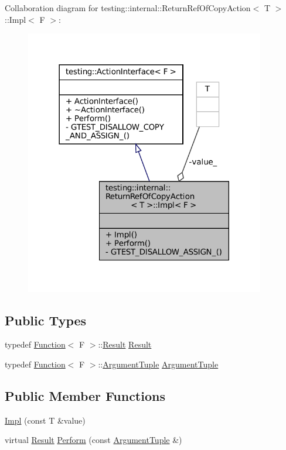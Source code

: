 Collaboration diagram for testing\+:\+:internal\+:\+:Return\+Ref\+Of\+Copy\+Action$<$ T $>$\+:\+:Impl$<$ F $>$\+:
\nopagebreak
\begin{figure}[H]
\begin{center}
\leavevmode
\includegraphics[width=297pt]{classtesting_1_1internal_1_1ReturnRefOfCopyAction_1_1Impl__coll__graph}
\end{center}
\end{figure}
\subsection*{Public Types}
\begin{DoxyCompactItemize}
\item 
typedef \hyperlink{structtesting_1_1internal_1_1Function}{Function}$<$ F $>$\+::\hyperlink{classtesting_1_1ActionInterface_a7477de2fe3e4e01c59db698203acaee7}{Result} \hyperlink{classtesting_1_1internal_1_1ReturnRefOfCopyAction_1_1Impl_abb413010cf24f603295ac6426adbe9d0}{Result}
\item 
typedef \hyperlink{structtesting_1_1internal_1_1Function}{Function}$<$ F $>$\+::\hyperlink{classtesting_1_1ActionInterface_af72720d864da4d606629e83edc003511}{Argument\+Tuple} \hyperlink{classtesting_1_1internal_1_1ReturnRefOfCopyAction_1_1Impl_aae70fc272cfaa8efebffffdeaca36cea}{Argument\+Tuple}
\end{DoxyCompactItemize}
\subsection*{Public Member Functions}
\begin{DoxyCompactItemize}
\item 
\hyperlink{classtesting_1_1internal_1_1ReturnRefOfCopyAction_1_1Impl_a5019dc0a3f19a844e939a52abe63f473}{Impl} (const T \&value)
\item 
virtual \hyperlink{classtesting_1_1ActionInterface_a7477de2fe3e4e01c59db698203acaee7}{Result} \hyperlink{classtesting_1_1internal_1_1ReturnRefOfCopyAction_1_1Impl_aa208a2fce99a1e2e1913c89ec7a3bc5d}{Perform} (const \hyperlink{classtesting_1_1ActionInterface_af72720d864da4d606629e83edc003511}{Argument\+Tuple} \&)
\end{DoxyCompactItemize}
